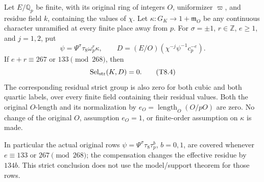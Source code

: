 \begin{theorem}
\label{AC-G141}
Let $E/\mathbb Q_p$ be finite, with its original ring of integers $O$,
uniformizer $\varpi$, and residue field $k$, containing the values of
$\chi$.  Let $\kappa:G_K\to1+\mathfrak m_O$ be any continuous character
unramified at every finite place away from $p$.  For $\sigma=\pm1$,
$r\in\mathbb Z$, $e\ge1$, and $j=1,2$, put
\[
 \psi=\Psi^\sigma\tau_8\omega_p^r\kappa,
 \qquad D=(E/O)(\chi^{-j}\psi^{-1}c_p^{-e}).
 \tag{T8.3}
\]
If $e+r\equiv267$ or $133\pmod{268}$, then
\[
                   \operatorname{Sel}_{\rm str}(K,D)=0.
 \tag{T8.4}
\]
The corresponding residual strict group is also zero for both cubic
and both quartic labels, over every finite field containing their
residual values.  Both the original $O$-length and its normalization
by $e_O=\operatorname{length}_O(O/pO)$ are zero.  No change of the
original $O$, assumption $e_O=1$, or finite-order assumption on
$\kappa$ is made.

In particular the actual original rows
$\psi=\Psi^\sigma\tau_8\tau_p^b$, $b=0,1$, are covered whenever
$e\equiv133$ or $267\pmod{268}$; the compensation changes the
effective residue by $134b$.  This strict conclusion does not use
the model/support theorem for those rows.
\end{theorem}

